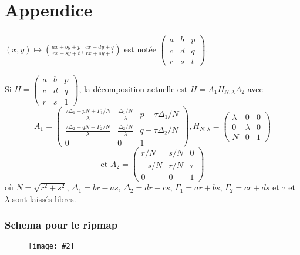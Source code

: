 \documentclass[c,12pt]{beamer}
\newcommand{\image}[2]{\begin{figure} \texttt{[image: \#2]}\end{figure}}
\newcommand{\matrice}[1]{\left(\begin{matrix} #1 \end{matrix}\right)}
\newcommand{\fram}[2]{\begin{frame} \frametitle{#1} #2 \end{frame}}
\begin{document}
  \appendix
  \section{Appendice}
\fram{}{  $(x,y)\mapsto \left(\frac{ax+by+p}{rx+sy+t},\frac{cx+dy+q}{rx+sy+t}\right)$ est notée $\matrice{a&b&p\\c&d&q\\r&s&t}$. %
   
   Si $H = \matrice{a&b&p\\c&d&q\\r&s&1}$, la décomposition actuelle est $H=A_1H_{N,\lambda}A_2$ avec
   \[A_1 = \matrice{\frac{\tau\Delta_1-pN+\Gamma_1/N}{\lambda} & \frac{\Delta_1/N}{\lambda} & p-\tau\Delta_1/N\\ \frac{\tau\Delta_2-qN+\Gamma_2/N}{\lambda} & \frac{\Delta_2/N}{\lambda} & q-\tau\Delta_2/N\\ 0 & 0 & 1}, H_{N,\lambda} = \matrice{\lambda & 0 & 0\\0 & \lambda & 0\\N & 0 & 1} \]
   \[\text{et }A_2 = \matrice{r/N & s/N & 0\\-s/N & r/N & \tau\\0 & 0 & 1}\]
   où $N=\sqrt{r^2+s^2}$, $\Delta_1=br-as$, $\Delta_2=dr-cs$, $\Gamma_1 = ar+bs$, $\Gamma_2 = cr+ds$ et $\tau$ et $\lambda$ sont laissés libres.
   
   
  }
 
 \fram{Schema pour le ripmap}{\image{0.5}{pbripmap}}
 
\end{document}
